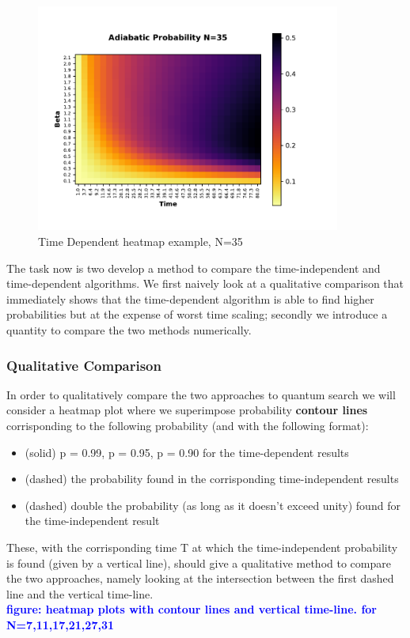 \documentclass[aps,pra,reprint, onecolumn, showkeys]{revtex4-2}
\newcommand{\blue}[1]{\textcolor{blue}{\textbf{figure: #1}}}
\begin{document}
\begin{figure}[ht]
\includegraphics[width=10cm]{./figures/example.pdf}%
\caption{Time Dependent heatmap example, N=35}
\end{figure}

The task now is two develop a method to compare the time-independent and time-dependent algorithms. We first naively look at a qualitative comparison that immediately shows that the time-dependent algorithm is able to find higher probabilities but at the expense of worst time scaling; secondly we introduce a quantity to compare the two methods numerically.

\subsubsection{Qualitative Comparison}
In order to qualitatively compare the two approaches to quantum search we will consider a heatmap plot where we superimpose probability \textbf{contour lines} corrisponding to the following probability (and with the following format):
\begin{itemize}
  \item (solid) p = 0.99, p = 0.95, p = 0.90 for the time-dependent results
  \item (dashed) the probability found in the corrisponding time-independent results
  \item (dashed) double the probability (as long as it doesn't exceed unity) found for the time-independent
 result
\end{itemize}
These, with the corrisponding time T at which the time-independent probability is found (given by a vertical line), should give a qualitative method to compare the two approaches, namely looking at the intersection between the first dashed line and the vertical time-line.\\
\blue{heatmap plots with contour lines and vertical time-line. for N=7,11,17,21,27,31}
\end{document}
